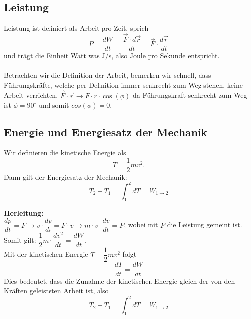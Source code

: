 \documentclass[12pt]{article}
\begin{document}
\newpage
\subsection*{Leistung}
Leistung ist definiert als Arbeit pro Zeit, sprich
\begin{equation}
P = \dfrac{dW}{dt} = \dfrac{\vec{F} \cdot d\vec{r}}{dt} = \vec{F} \cdot \dfrac{d\vec{r}}{dt}
\end{equation}
und trägt die Einheit Watt was J/s, also Joule pro Sekunde entspricht.\\\\
Betrachten wir die Definition der Arbeit, bemerken wir schnell, dass Führungskräfte, welche per Definition immer senkrecht zum Weg stehen, keine Arbeit verrichten. $\vec{F} \cdot \vec{r} \rightarrow F \cdot r\cdot \cos(\phi)$ da Führungskraft senkrecht zum Weg ist $\phi = 90^\circ$ und somit $cos(\phi) = 0$.
\subsection*{Energie und Energiesatz der Mechanik}
Wir definieren die kinetische Energie als 
\begin{equation}
 T = \dfrac{1}{2}mv^2 .
\end{equation}
Dann gilt der Energiesatz der Mechanik:
\begin{equation}
T_2 - T_1 = \int_1^2 dT = W_{1\rightarrow 2}
\end{equation}

\textbf{Herleitung:} \\
$\dfrac{dp}{dt} = F \rightarrow v \cdot \dfrac{dp}{dt} = F \cdot v \rightarrow m\cdot v \cdot \dfrac{dv}{dt} = P$, wobei mit $P$ die Leistung gemeint ist. Somit gilt: $\dfrac{1}{2}m\cdot\dfrac{dv^2}{dt} = \dfrac{dW}{dt}$. \\
Mit der kinetischen Energie $T = \dfrac{1}{2}mv^2$ folgt
\begin{equation}
\dfrac{dT}{dt} = \dfrac{dW}{dt}
\end{equation}
Dies bedeutet, dass die Zunahme der kinetischen Energie gleich der von den Kräften geleisteten Arbeit ist, also
\begin{equation}
T_2 - T_1 = \int_1^2 dT = W_{1\rightarrow 2}
\end{equation}
\end{document}
